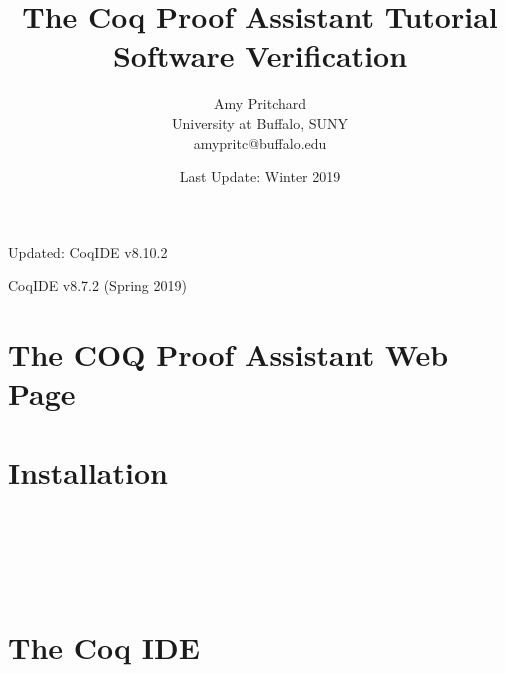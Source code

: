 \documentclass{article}
\title{\textbf{The Coq Proof Assistant Tutorial} 
	\\ Software Verification}
\author{Amy Pritchard 
	\\ University at Buffalo, SUNY
	\\ amypritc@buffalo.edu}
\date{Last Update: Winter 2019}
\begin{document}
\maketitle

\begin{center}
	Updated: CoqIDE v8.10.2 
	
	CoqIDE v8.7.2 (Spring 2019)
\end{center}

\newpage
\tableofcontents


\newpage
\section{The COQ Proof Assistant Web Page}
	

\section{Installation} 
	 

~\\~\\~\\~\\
\section{The Coq IDE}
	
\end{document}
